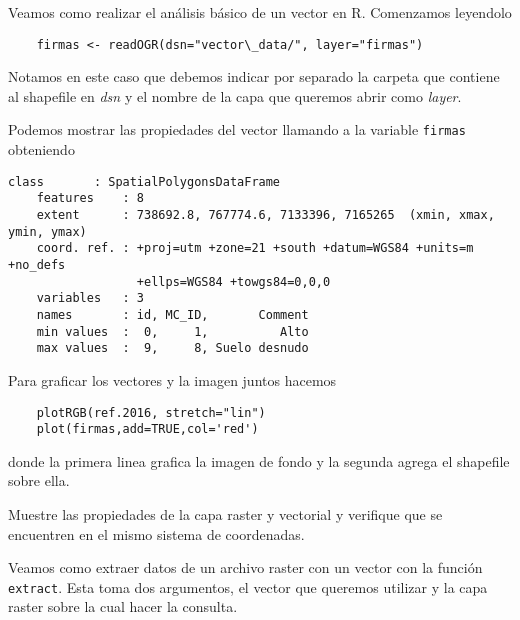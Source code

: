 \begin{exa}
    Veamos como realizar el an\'alisis b\'asico de un vector en R. Comenzamos
    leyendolo

    \begin{lstlisting}
    firmas <- readOGR(dsn="vector\_data/", layer="firmas")
    \end{lstlisting}

    Notamos en este caso que debemos indicar por separado la carpeta que
    contiene al shapefile en \emph{dsn} y el nombre de la capa que queremos
    abrir como \emph{layer}.

    Podemos mostrar las propiedades del vector llamando a la variable
    \texttt{firmas} obteniendo
    \begin{Verbatim}[fontsize=\small]
    class       : SpatialPolygonsDataFrame
    features    : 8
    extent      : 738692.8, 767774.6, 7133396, 7165265  (xmin, xmax, ymin, ymax)
    coord. ref. : +proj=utm +zone=21 +south +datum=WGS84 +units=m +no_defs
                  +ellps=WGS84 +towgs84=0,0,0
    variables   : 3
    names       : id, MC_ID,       Comment
    min values  :  0,     1,          Alto
    max values  :  9,     8, Suelo desnudo
    \end{Verbatim}

    Para graficar los vectores y la imagen juntos hacemos

    \begin{lstlisting}
    plotRGB(ref.2016, stretch="lin")
    plot(firmas,add=TRUE,col='red')
    \end{lstlisting}
    donde la primera linea grafica la imagen de fondo y la segunda agrega el
    shapefile sobre ella.
\end{exa}

\begin{act}
    Muestre las propiedades de la capa raster y vectorial y verifique
    que se encuentren en el mismo sistema de coordenadas.
\end{act}

Veamos como extraer datos de un archivo raster con un vector con la funci\'on
\texttt{extract}. Esta toma dos argumentos, el vector que queremos
utilizar y la capa raster sobre la cual hacer la consulta.

